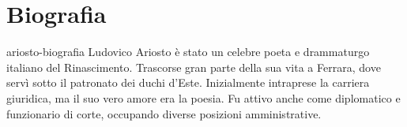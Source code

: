\documentclass[preview]{standalone}
\begin{document}
\genpage

\section{Biografia}

\begin{snippet}{ariosto-biografia}
    Ludovico Ariosto è stato un celebre poeta e drammaturgo italiano del Rinascimento.
    Trascorse gran parte della sua vita a Ferrara, dove servì sotto il patronato
    dei duchi d'Este. Inizialmente intraprese la carriera giuridica,
    ma il suo vero amore era la poesia.
    Fu attivo anche come diplomatico e funzionario di corte,
    occupando diverse posizioni amministrative.
    
\end{snippet}
\end{document}
